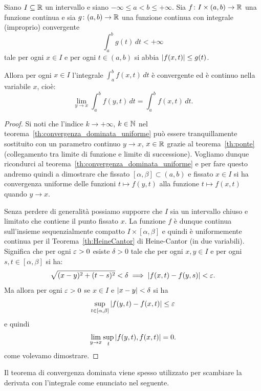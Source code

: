 \begin{theorem}
  \label{th:convergenza_dominata}%
  \mymark{**}%
Siano $I\subseteq {\mathbb R}$ un intervallo e siano 
$-\infty \le a < b \le +\infty$.
Sia $f\colon I \times(a,b)\to {\mathbb R}$ una funzione continua 
e sia $g\colon(a,b)\to {\mathbb R}$ una funzione continua con integrale 
(improprio) convergente
\[
 \int_a^b g(t)\, dt < +\infty
\]
tale per ogni $x\in I$ e per ogni $t\in(a,b)$ si abbia ${\left|f(x,t)\right|} \le g(t)$.

Allora per ogni $x\in I$ l'integrale $\int_a^b f(x,t)\, dt$ è convergente ed è continuo 
nella variabile $x$, cioè:
\[
  \lim_{y\to x} \int_a^b f(y,t)  \, dt 
  = \int_a^b f(x,t)\, dt.
\]
\end{theorem}
%
\begin{proof}
Si noti che l'indice $k\to +\infty$, $k\in {\mathbb N}$ 
nel teorema~\ref{th:convergenza_dominata_uniforme} 
può essere tranquillamente sostituito con 
un parametro continuo $y\to x$, $x\in {\mathbb R}$
grazie al teorema~\ref{th:ponte} (collegamento tra limite 
di funzione e limite di successione).
Vogliamo dunque ricondurci al teorema~\ref{th:convergenza_dominata_uniforme} 
e per fare questo andremo quindi a dimostrare che fissato $[\alpha,\beta]\subset (a,b)$ 
e fissato $x\in I$ si ha convergenza uniforme 
delle funzioni $t\mapsto f(y,t)$ alla funzione $t\mapsto f(x,t)$
quando $y\to x$. 

Senza perdere di generalità possiamo supporre che $I$ sia un intervallo chiuso e limitato 
che contiene il punto fissato $x$. 
La funzione $f$ è dunque continua sull'insieme sequenzialmente compatto $I\times [\alpha,\beta]$ 
e quindi è uniformemente continua
per il Teorema~\ref{th:HeineCantor} di Heine-Cantor (in due variabili).
Significa che per ogni $\varepsilon>0$ esiste $\delta>0$ tale che per ogni $x,y\in I$ 
e per ogni $s,t\in[\alpha,\beta]$ si ha:
\[
\sqrt{(x-y)^2+(t-s)^2} < \delta \implies {\left|f(x,t)-f(y,s)\right|} < \varepsilon.  
\]
Ma allora per ogni $\varepsilon>0$ se $x\in I$ e ${\left|x-y\right|} < \delta$ si ha 
\[
  \sup_{t\in\left[\alpha,\beta\right]} {\left|f(y,t)-f(x,t)\right|} \le \varepsilon
\]
e quindi
\[
  \lim_{y\to x}  \sup_t {\left|f(y,t), f(x,t)\right|} = 0.
\]
come volevamo dimostrare.
\end{proof}
%
Il teorema di convergenza dominata viene spesso utilizzato 
per scambiare la derivata con l'integrale come enunciato nel seguente.
%

